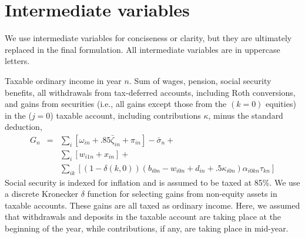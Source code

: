 \documentclass{report}[fleqn,12pt]
\begin{document}
\section{Intermediate variables}
We use intermediate variables for conciseness or clarity,
but they are ultimately replaced in the final formulation.
All intermediate variables are in uppercase letters.
\begin{description}[leftmargin=4em,style=multiline]
\item [$G_n$]
	Taxable ordinary income in year $n$. Sum of wages, pension, social security benefits, all withdrawals
	from tax-deferred accounts, including Roth conversions, and gains from securities
	(i.e., all gains except those from the $(k=0)$ equities)
	in the ($j=0$) taxable account, including contributions $\kappa$, minus the standard deduction,
	\begin{eqnarray}
		\label{Eq:Tx2}
		G_n &=& 
		\sum_{i} [\omega_{in} + .85\bar\zeta_{in} + \pi_{in}]
		- \bar{\sigma}_n +
		\nonumber \\
		&& \sum_{i} [w_{i1n} + x_{in}] +
		\nonumber \\
		&& \sum_{ik} 
		[(1-\delta(k, 0))(b_{i0n} - w_{i0n} + d_{in} + .5\kappa_{i0n})\alpha_{i0kn}\tau_{kn}]
	\end{eqnarray}
	Social security is indexed for inflation and is assumed to be taxed at 85\%.
	We use a discrete Kronecker $\delta$ function for selecting gains from non-equity assets in
	taxable accounts. These gains are all taxed as ordinary income. Here, we assumed that
	withdrawals and deposits in the taxable account are taking place at the beginning of the year, while
	contributions, if any, are taking place in mid-year.


\end{description}
\end{document}
